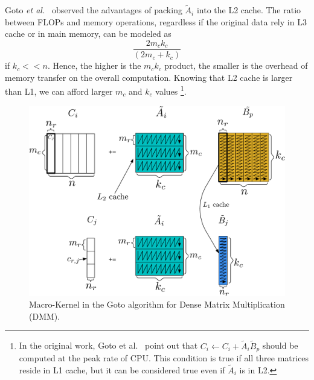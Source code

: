 Goto \textit{et al.}~\cite{goto2008anatomy} observed the advantages of packing $\tilde{A}_i$ into the L2 cache. The ratio between FLOPs and memory operations, regardless if the original data rely in L3 cache or in main memory, can be modeled as
 $$ \frac{2 m_{c} k_{c}}{\left(2 m_{c}+k_{c}\right)} $$
if $k_c << n$.
Hence, the higher is the $m_c k_c$ product, the smaller is the overhead of memory transfer on the overall computation. 
Knowing that L2 cache is larger than L1, we can afford larger $m_c$ and $k_c$ values \footnote{In the original work, Goto et al.~\cite{goto2008anatomy} point out that $C_i \leftarrow C_i +  \tilde{A}_i  \tilde{B}_p $ should be computed at the peak rate of CPU. This condition is true if all three matrices reside in L1 cache, but it can be considered true even if $\tilde{A}_i$ is in L2.}.


\begin{figure}
	\centering
	\includegraphics[width=0.95\columnwidth ]{imgs/Goto_second.pdf}
		\caption{Macro-Kernel in the Goto algorithm for Dense Matrix Multiplication (DMM).}
		\label{fig:gotosecond}
\end{figure}



